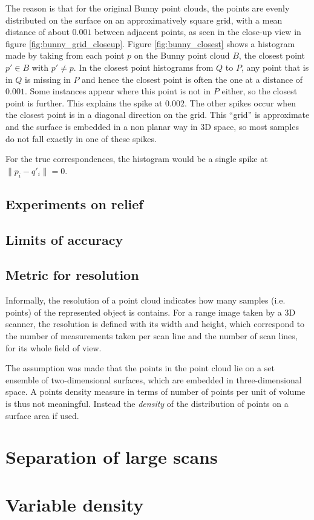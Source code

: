 The reason is that for the original Bunny point clouds, the points are evenly distributed on the surface on an approximatively square grid, with a mean distance of about $0.001$ between adjacent points, as seen in the close-up view in figure \ref{fig:bunny_grid_closeup}. Figure \ref{fig:bunny_closest} shows a histogram made by taking from each point $p$ on the Bunny point cloud $B$, the closest point $p' \in B$ with $p' \neq p$. In the closest point histograms from $Q$ to $P$, any point that is in $Q$ is missing in $P$ and hence the closest point is often the one at a distance of $0.001$. Some instances appear where this point is not in $P$ either, so the closest point is further. This explains the spike at $0.002$. The other spikes occur when the closest point is in a diagonal direction on the grid. This ``grid'' is approximate and the surface is embedded in a non planar way in 3D space, so most samples do not fall exactly in one of these spikes.

For the true correspondences, the histogram would be a single spike at $\|p_i - q'_i\| = 0$. 



\subsection{Experiments on relief}



\subsection{Limits of accuracy}




\subsection{Metric for resolution}
Informally, the resolution of a point cloud indicates how many samples (i.e. points) of the represented object is contains. For a range image taken by a 3D scanner, the resolution is defined with its width and height, which correspond to the number of measurements taken per scan line and the number of scan lines, for its whole field of view.

The assumption was made that the points in the point cloud lie on a set ensemble of two-dimensional surfaces, which are embedded in three-dimensional space. A points density measure in terms of number of points per unit of volume is thus not meaningful. Instead the \emph{density} of the distribution of points on a surface area if used.




\section{Separation of large scans}

\section{Variable density}
